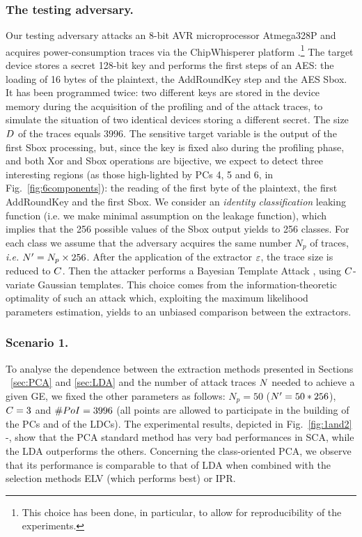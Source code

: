 \subsubsection{The testing adversary.}  Our testing adversary attacks an 8-bit AVR microprocessor Atmega328P and acquires power-consumption traces via the ChipWhisperer platform \cite{o2014chipwhisperer}.\footnote{This choice has been done, in particular, to allow for reproducibility of the experiments.} The target device stores a secret 128-bit key and performs the first steps of an AES: the loading of 16 bytes of the plaintext, the AddRoundKey step and the AES Sbox. It has been programmed twice: two different keys are stored in the device memory during the acquisition of the profiling and of the attack traces, to simulate the situation of two identical devices storing a different secret. The size $\traceLength$ of the traces equals $3996$. The sensitive target  variable is the output of the first Sbox processing, but, since the key is fixed also during the profiling phase, and both Xor and Sbox operations are bijective, we expect to detect three interesting regions (as those high-lighted by PCs 4, 5 and 6, in Fig.~\ref{fig:6components}): the reading of the first byte of the plaintext, the first AddRoundKey and the first Sbox. We consider an {\em identity classification} leaking function (i.e. we make minimal assumption on the leakage function), which implies that the 256 possible values of the Sbox output yields to 256 classes. For each class we assume that the adversary acquires the same number $N_p$ of traces, \textit{i.e.} $\numTraces[]' = N_p\times 256$. After the application of the extractor $\extract$, the trace size is reduced to $\newTraceLength$. Then the attacker performs a Bayesian Template Attack \cite{Chari2003}, using $\newTraceLength$-variate Gaussian templates. This choice comes from the information-theoretic optimality of such an attack which, exploiting the maximum likelihood parameters estimation, yields to an unbiased comparison between the extractors.


\subsubsection{Scenario 1.}
To analyse the dependence between the extraction methods presented in Sections ~\ref{sec:PCA} and \ref{sec:LDA} and the number of attack traces $\numTraces[]$ needed to achieve a given GE, we fixed the other parameters as follows: $N_p=50$ ($\numTraces[]'=50*256$), $\newTraceLength = 3$ and $\numPoI = 3996$ (all points are allowed to participate in the building of the PCs and of the LDCs). The experimental results, depicted in Fig.~\ref{fig:1and2} -, show that the PCA standard method has very bad performances in SCA, while the LDA outperforms the others. Concerning the class-oriented PCA, we observe that its performance is comparable to that of LDA when combined with the selection methods ELV (which performs best) or IPR.  



